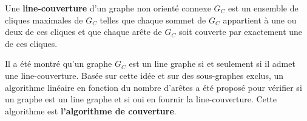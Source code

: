 \begin{definition}
Une {\bf line-couverture} d'un graphe non orient\'e connexe $G_C$ est un ensemble de cliques maximales de $G_C$ telles que chaque sommet de $G_C$ appartient \`a une ou deux de ces cliques et que chaque ar\^ete de $G_C$ soit couverte par exactement une de ces cliques.
\end{definition}

Il a \'et\'e montr\'e qu'un graphe $G_C$ est  un line graphe si et seulement si il admet une line-couverture.
Bas\'ee sur cette id\'ee et sur des sous-graphes exclus, un algorithme lin\'eaire en fonction du nombre d'ar\^etes a \'et\'e propos\'e pour v\'erifier  si un graphe est un line graphe et si oui en fournir la line-couverture.
Cette algorithme est {\bf l'algorithme de couverture}.


